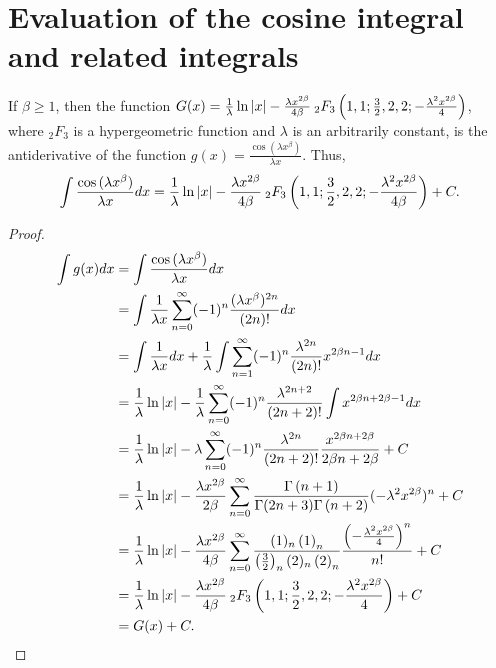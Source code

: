 \documentclass[smallextended]{svjour3}
\begin{document}
\section{Evaluation of the cosine integral and related integrals}\label{cosine-integral}
\begin{theorem}
If $\beta\ge1$, then the function $G(x)=\frac{1}{\lambda}\ln|x|-\frac{\lambda x^{2\beta}}{4\beta}\hspace{.075cm} _{2}F_{3}\left(1,1;\frac{3}{2},2,2;-\frac{\lambda^2 x^{2\beta}}{4}\right)$, where ${}_2F_3$ is a hypergeometric function \cite{AS} and $\lambda$ is an arbitrarily constant, is the antiderivative of the function $g(x)=\frac{\cos{(\lambda x^\beta)
}}{\lambda x}$. Thus,
\begin{equation}
\int\frac{\cos{(\lambda x^\beta)}}{\lambda x}dx=\frac{1}{\lambda}\ln|x|-\frac{\lambda x^{2\beta}}{4\beta}\hspace{.075cm} _{2}F_{3}\left(1,1;\frac{3}{2},2,2;-\frac{\lambda^2 x^{2\beta}}{4\beta}\right)+C.
\label{Thm3-1}
\end{equation}
\label{Thm3}
\end{theorem}

\begin{proof}
\begin{align}
\int g(x) dx&=\int \frac{\cos{(\lambda x^\beta)
}}{\lambda x}dx \nonumber\\ &=\int\frac{1}{\lambda x}\sum\limits_{n=0}^{\infty}(-1)^n\frac{(\lambda x^\beta)^{2n}}{(2n)!}dx
\nonumber\\ &=\int\frac{1}{\lambda x}dx+\frac{1}{\lambda}\int\sum\limits_{n=1}^{\infty}(-1)^n\frac{\lambda^{2n}}{(2n)!}x^{2\beta n-1}dx
\nonumber\\&=\frac{1}{\lambda}\ln|x|-\frac{1}{\lambda}\sum\limits_{n=0}^{\infty}(-1)^n\frac{\lambda^{2n+2}}{(2n+2)!}\int x^{2\beta n+2\beta-1} dx
\nonumber\\&=\frac{1}{\lambda}\ln|x|-\lambda\sum\limits_{n=0}^{\infty}(-1)^n\frac{\lambda^{2n}}{(2n+2)!}\frac{x^{2\beta n+2\beta}}{2\beta n+2\beta}+C
\nonumber\\&=\frac{1}{\lambda}\ln|x|-\frac{\lambda x^{2\beta}}{2\beta}\sum\limits_{n=0}^{\infty}
\frac{\Gamma\left(n+1\right)}{\Gamma(2n+3)\Gamma\left(n+2\right)}(-\lambda^2 x^{2\beta})^{n}+C
\nonumber\\&=\frac{1}{\lambda}\ln|x|-\frac{\lambda x^{2\beta}}{4\beta}\sum\limits_{n=0}^{\infty}\frac{(1)_n\left(1\right)_n}{\left(\frac{3}{2}\right)_n (2)_n\left(2\right)_n}\frac{\left(-\frac{\lambda^2 x^{2\beta}}{4}\right)^{n}}{n!}+C
\nonumber\\&=\frac{1}{\lambda}\ln|x|-\frac{\lambda x^{2\beta}}{4\beta}\hspace{.075cm} _{2}F_{3}\left(1,1;\frac{3}{2},2,2;-\frac{\lambda^2 x^{2\beta}}{4}\right)+C
\nonumber\\&=G(x)+C.
\end{align}
\end{proof}
\end{document}
